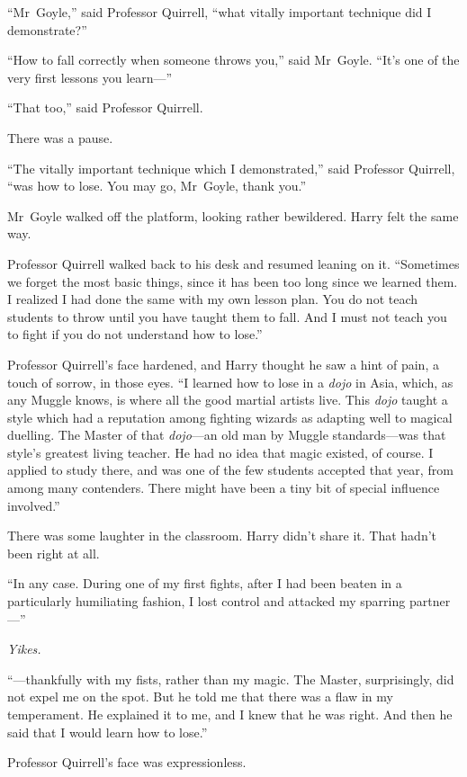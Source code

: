 “Mr~Goyle,” said Professor Quirrell, “what vitally important technique did I demonstrate?”

“How to fall correctly when someone throws you,” said Mr~Goyle. “It’s one of the very first lessons you learn—”

“That too,” said Professor Quirrell.

There was a pause.

“The vitally important technique which I demonstrated,” said Professor Quirrell, “was how to lose. You may go, Mr~Goyle, thank you.”

Mr~Goyle walked off the platform, looking rather bewildered. Harry felt the same way.

Professor Quirrell walked back to his desk and resumed leaning on it. “Sometimes we forget the most basic things, since it has been too long since we learned them. I realized I had done the same with my own lesson plan. You do not teach students to throw until you have taught them to fall. And I must not teach you to fight if you do not understand how to lose.”

Professor Quirrell’s face hardened, and Harry thought he saw a hint of pain, a touch of sorrow, in those eyes. “I learned how to lose in a \emph{dojo} in Asia, which, as any Muggle knows, is where all the good martial artists live. This \emph{dojo} taught a style which had a reputation among fighting wizards as adapting well to magical duelling. The Master of that \emph{dojo}—an old man by Muggle standards—was that style’s greatest living teacher. He had no idea that magic existed, of course. I applied to study there, and was one of the few students accepted that year, from among many contenders. There might have been a tiny bit of special influence involved.”

There was some laughter in the classroom. Harry didn’t share it. That hadn’t been right at all.

“In any case. During one of my first fights, after I had been beaten in a particularly humiliating fashion, I lost control and attacked my sparring partner—”

\emph{Yikes.}

“—thankfully with my fists, rather than my magic. The Master, surprisingly, did not expel me on the spot. But he told me that there was a flaw in my temperament. He explained it to me, and I knew that he was right. And then he said that I would learn how to lose.”

Professor Quirrell’s face was expressionless.

